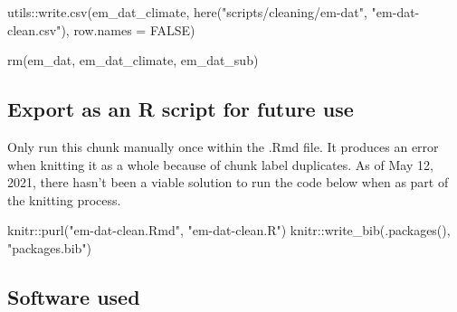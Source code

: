 \documentclass[
  12pt,
]{article}
\newenvironment{Shaded}{}{}
\newcommand{\AttributeTok}[1]{\textcolor[rgb]{0.49,0.56,0.16}{#1}}
\newcommand{\ConstantTok}[1]{\textcolor[rgb]{0.53,0.00,0.00}{#1}}
\newcommand{\FunctionTok}[1]{\textcolor[rgb]{0.02,0.16,0.49}{#1}}
\newcommand{\NormalTok}[1]{#1}
\newcommand{\SpecialCharTok}[1]{\textcolor[rgb]{0.25,0.44,0.63}{#1}}
\newcommand{\StringTok}[1]{\textcolor[rgb]{0.25,0.44,0.63}{#1}}
\begin{document}
\begin{Shaded}
\begin{Highlighting}[]
\NormalTok{utils}\SpecialCharTok{::}\FunctionTok{write.csv}\NormalTok{(em\_dat\_climate, }\FunctionTok{here}\NormalTok{(}\StringTok{"scripts/cleaning/em{-}dat"}\NormalTok{, }
    \StringTok{"em{-}dat{-}clean.csv"}\NormalTok{), }\AttributeTok{row.names =} \ConstantTok{FALSE}\NormalTok{)}

\FunctionTok{rm}\NormalTok{(em\_dat, em\_dat\_climate, em\_dat\_sub)}
\end{Highlighting}
\end{Shaded}

\hypertarget{export-as-an-r-script-for-future-use}{%
\subsection{Export as an R script for future
use}\label{export-as-an-r-script-for-future-use}}

Only run this chunk manually once within the .Rmd file. It produces an
error when knitting it as a whole because of chunk label duplicates. As
of May 12, 2021, there hasn't been a viable solution to run the code
below when as part of the knitting process.

\begin{Shaded}
\begin{Highlighting}[]
\NormalTok{knitr}\SpecialCharTok{::}\FunctionTok{purl}\NormalTok{(}\StringTok{"em{-}dat{-}clean.Rmd"}\NormalTok{, }\StringTok{"em{-}dat{-}clean.R"}\NormalTok{)}
\NormalTok{knitr}\SpecialCharTok{::}\FunctionTok{write\_bib}\NormalTok{(}\FunctionTok{.packages}\NormalTok{(), }\StringTok{"packages.bib"}\NormalTok{)}
\end{Highlighting}
\end{Shaded}

\hypertarget{software-used}{%
\subsection*{Software used}\label{software-used}}
\end{document}
